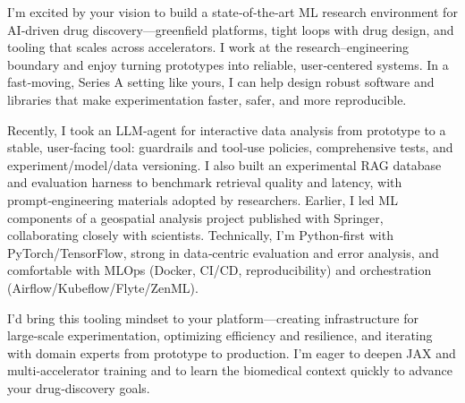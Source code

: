I’m excited by your vision to build a state‑of‑the‑art ML research environment for AI‑driven drug discovery—greenfield platforms, tight loops with drug design, and tooling that scales across accelerators. I work at the research–engineering boundary and enjoy turning prototypes into reliable, user‑centered systems. In a fast‑moving, Series A setting like yours, I can help design robust software and libraries that make experimentation faster, safer, and more reproducible.

Recently, I took an LLM‑agent for interactive data analysis from prototype to a stable, user‑facing tool: guardrails and tool‑use policies, comprehensive tests, and experiment/model/data versioning. I also built an experimental RAG database and evaluation harness to benchmark retrieval quality and latency, with prompt‑engineering materials adopted by researchers. Earlier, I led ML components of a geospatial analysis project published with Springer, collaborating closely with scientists. Technically, I’m Python‑first with PyTorch/TensorFlow, strong in data‑centric evaluation and error analysis, and comfortable with MLOps (Docker, CI/CD, reproducibility) and orchestration (Airflow/Kubeflow/Flyte/ZenML).

I’d bring this tooling mindset to your platform—creating infrastructure for large‑scale experimentation, optimizing efficiency and resilience, and iterating with domain experts from prototype to production. I’m eager to deepen JAX and multi‑accelerator training and to learn the biomedical context quickly to advance your drug‑discovery goals.